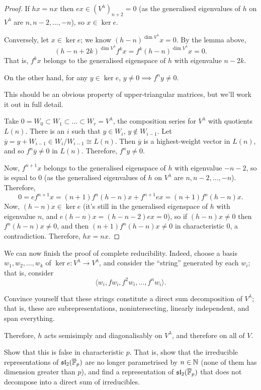 \begin{proof}
If $hx = nx$ then $ex \in (V^\lambda)_{n+2} = 0$ (as the generalised
eigenvalues of $h$ on $V^\lambda$ are $n, n - 2, \dots, -n$), so
$x \in \ker e$.

Conversely, let $x \in \ker e$; we know $(h - n)^{\dim V^\lambda}x = 0$. By
the lemma above,
\[
  (h - n + 2k)^{\dim V^\lambda}f^kx = f^k(h - n)^{\dim V^\lambda}x = 0.
\]
That is, $f^kx$ belongs to the generalised eigenspace of $h$ with eigenvalue
$n - 2k$.

On the other hand, for any $y \in \ker e$, $y \neq 0 \implies f^ny \neq 0$.

\begin{remark}
This should be an obvious property of upper-triangular matrices, but we'll
work it out in full detail.
\end{remark}

Take $0 = W_0 \subset W_1 \subset \dots \subset W_r = V^\lambda$, the
composition series for $V^\lambda$ with quotients $L(n)$. There is an $i$ such
that $y \in W_i$, $y \notin W_{i-1}$. Let
$\overline{y} = y + W_{i-1} \in W_i/W_{i-1} \cong L(n)$. Then $\overline{y}$ is
a highest-weight vector in $L(n)$, and so $f^n\overline{y} \neq 0$ in $L(n)$.
Therefore, $f^ny \neq 0$.

Now, $f^{n+1}x$ belongs to the generalised eigenspace of $h$ with eigenvalue
$-n - 2$, so is equal to $0$ (as the generalised eigenvalues of $h$ on
$V^\lambda$ are $n, n - 2, \dots, -n$). Therefore,
\[
  0 = ef^{n+1}x = (n + 1)f^n(h - n)x + f^{n+1}ex = (n + 1)f^n(h - n)x.
\]
Now, $(h - n)x \in \ker e$ (it's still in the generalised eigenspace of $h$
with eigenvalue $n$, and $e(h - n)x = (h - n - 2)ex = 0$), so if
$(h - n)x \neq 0$ then $f^n(h - n)x \neq 0$, and then
$(n + 1)f^n(h - n)x \neq 0$ in characteristic $0$, a contradiction. Therefore,
$hx = nx$.
\end{proof}

We can now finish the proof of complete reducibility. Indeed, choose a basis
$w_1, w_2, \dots, w_k$ of $\ker e\colon V^\lambda \to V^\lambda$, and consider
the ``string'' generated by each $w_i$; that is, consider
\[
  \langle w_i, fw_i, f^2w_i, \dots, f^nw_i\rangle.
\]

\begin{exercise}
Convince yourself that these strings constitute a direct sum decomposition of
$V^\lambda$; that is, these are subrepresentations, nonintersecting, linearly
independent, and span everything.
\end{exercise}

Therefore, $h$ acts semisimply and diagonalisably on $V^\lambda$, and
therefore on all of $V$.

\begin{exercise}
Show that this is false in characteristic $p$. That is, show that the
irreducible representations of $\mathfrak{sl}_2(\overline{\mathbb{F}}_p)$ are no longer parametrised by
$n \in \mathbb{N}$ (none of them has dimension greater than $p$), and find a
representation of $\mathfrak{sl}_2(\overline{\mathbb{F}}_p)$ that does not decompose into a direct sum of
irreducibles.
\end{exercise}
